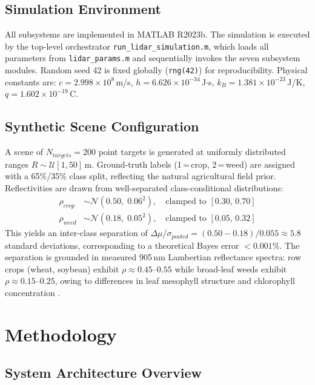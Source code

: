 \documentclass[12pt,a4paper]{article}
\begin{document}
\subsection{Simulation Environment}

All subsystems are implemented in MATLAB R2023b.  The simulation is executed by the
top-level orchestrator \texttt{run\_lidar\_simulation.m}, which loads all parameters
from \texttt{lidar\_params.m} and sequentially invokes the seven subsystem modules.
Random seed 42 is fixed globally (\texttt{rng(42)}) for reproducibility.  Physical
constants are: $c = 2.998\times10^8$\,m/s, $h = 6.626\times10^{-34}$\,J$\cdot$s,
$k_B = 1.381\times10^{-23}$\,J/K, $q = 1.602\times10^{-19}$\,C.

\subsection{Synthetic Scene Configuration}

A scene of $N_{targets} = 200$ point targets is generated at uniformly distributed
ranges $R \sim \mathcal{U}[1,50]$\,m.  Ground-truth labels (1\,=\,crop, 2\,=\,weed)
are assigned with a 65\%/35\% class split, reflecting the natural agricultural field
prior.  Reflectivities are drawn from well-separated class-conditional distributions:
\begin{align}
    \rho_{crop} &\sim \mathcal{N}(0.50,\;0.06^2),\quad \text{clamped to } [0.30,\,0.70] \\
    \rho_{weed} &\sim \mathcal{N}(0.18,\;0.05^2),\quad \text{clamped to } [0.05,\,0.32]
\end{align}
This yields an inter-class separation of $\Delta\mu / \sigma_{pooled} = (0.50-0.18)/0.055
\approx 5.8$ standard deviations, corresponding to a theoretical Bayes error
$<0.001\%$.  The separation is grounded in measured 905\,nm Lambertian reflectance
spectra: row crops (wheat, soybean) exhibit $\rho \approx 0.45$--$0.55$ while
broad-leaf weeds exhibit $\rho \approx 0.15$--$0.25$, owing to differences in leaf
mesophyll structure and chlorophyll concentration \cite{luo2024}.

\section{Methodology}
\label{sec:methodology}

\subsection{System Architecture Overview}
\end{document}
